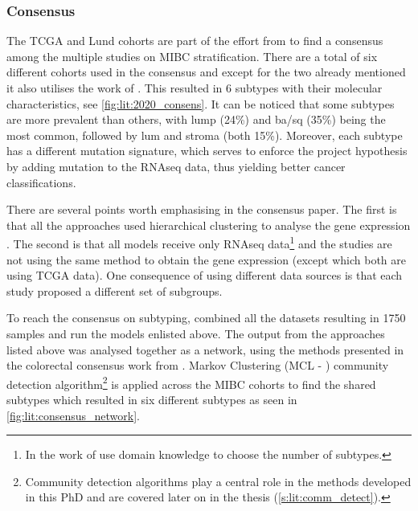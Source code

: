 \subsubsection*{Consensus} \label{s:lit:consensus_mibc}

The TCGA and Lund cohorts are part of the effort from \citet{Kamoun2020-tj} to find a consensus among the multiple studies on MIBC stratification. There are a total of six different cohorts used in the consensus and except for the two already mentioned \citep{Kamoun2020-tj} it also utilises the work of \citep{Mo2018-rl, Damrauer2014-tc, Choi2014-ed, Rebouissou2014-ep}. This resulted in 6 subtypes with their molecular characteristics, see \cref{fig:lit:2020_consens}. It can be noticed that some subtypes are more prevalent than others, with \acrfull{lump} (24\%) and \acrlong{ba/sq} (35\%) being the most common, followed by \acrlong{lum} and \acrlong{stroma} (both 15\%). Moreover, each subtype has a different mutation signature, which serves to enforce the project hypothesis by adding mutation to the RNAseq data, thus yielding better cancer classifications.

There are several points worth emphasising in the consensus paper. The first is that all the approaches used hierarchical clustering to analyse the gene expression \citep{Mo2018-rl, Damrauer2014-tc, Choi2014-ed, Marzouka2018-ge, Rebouissou2014-ep,Robertson2017-mg}. The second is that all models receive only RNAseq data\footnote{In the work of \citeauthor{Robertson2017-mg} use domain knowledge to choose the number of subtypes.} and the studies are not using the same method to obtain the gene expression (except \citep{Robertson2017-mg, Mo2018-rl} which both are using TCGA data). One consequence of using different data sources is that each study proposed a different set of subgroups. 

To reach the consensus on subtyping, \citeauthor{Kamoun2020-tj} combined all the datasets resulting in 1750 samples and run the models enlisted above. The output from the approaches listed above was analysed together as a network, using the methods presented in the colorectal consensus work from \citet{Guinney2015-fy}. Markov Clustering (MCL - \citet{Van_Dongen2008-yj}) community detection algorithm\footnote{Community detection algorithms play a central role in the methods developed in this PhD and are covered later on in the thesis (\cref{s:lit:comm_detect}).} is applied  across the MIBC cohorts to find the shared subtypes which resulted in six different subtypes as seen in \cref{fig:lit:consensus_network}. 

